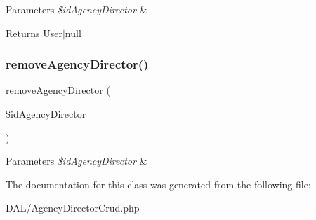 \begin{DoxyParams}{Parameters}
{\em \$id\+Agency\+Director} & \\
\hline
\end{DoxyParams}
\begin{DoxyReturn}{Returns}
User$\vert$null 
\end{DoxyReturn}
\mbox{\label{class_app_1_1_d_a_l_1_1_agency_director_crud_aab3676ef04d81d0f17434f67e61ece2f}} 
\subsubsection{\texorpdfstring{removeAgencyDirector()}{removeAgencyDirector()}}
{\footnotesize\ttfamily remove\+Agency\+Director (\begin{DoxyParamCaption}\item[{}]{\$id\+Agency\+Director }\end{DoxyParamCaption})}


\begin{DoxyParams}{Parameters}
{\em \$id\+Agency\+Director} & \\
\hline
\end{DoxyParams}


The documentation for this class was generated from the following file\+:\begin{DoxyCompactItemize}
\item 
D\+A\+L/Agency\+Director\+Crud.\+php\end{DoxyCompactItemize}
